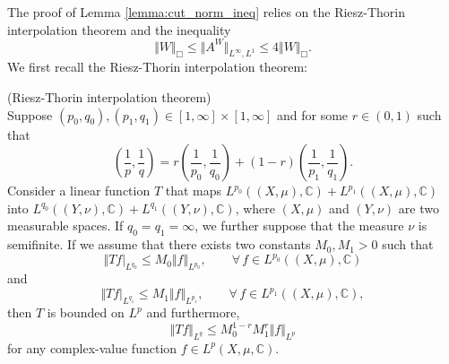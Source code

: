 The proof of Lemma \ref{lemma:cut_norm_ineq} relies on the Riesz-Thorin interpolation theorem and the inequality $$	\Vert W \Vert_{\Box} \leq \Vert A^W \Vert_{L^{\infty}, L^1} \leq 4 \Vert W \Vert_{\Box}.$$
We first recall the Riesz-Thorin interpolation theorem: 
\begin{theorem}(Riesz-Thorin interpolation theorem)\\
	Suppose $(p_0, q_0), (p_1, q_1)  \in [1,\infty] \times [1, \infty]$ and for some $r \in (0,1)$ such that
	$$ \left( \frac{1}{p}, \frac{1}{q} \right) = r  \left(\frac{1}{p_0}, \frac{1}{q_0} \right) + (1-r) \left( \frac{1}{p_1}, \frac{1}{q_1} \right).$$
	Consider a linear function $T$ that maps $L^{p_0}( (X, \mu), \mathbb{C})+ L^{p_1}( (X, \mu), \mathbb{C})$ into $L^{q_0}((Y, \nu), \mathbb{C}) + L^{q_1}( (Y, \nu), \mathbb{C})$, where $(X,\mu)$ and $(Y,\nu)$ are two measurable spaces. If $q_0 = q_1 = \infty$, we further suppose that the measure $\nu$ is semifinite.
	If we assume that there exists two constants $M_0, M_1 >0$ such that
	$$
	\Vert T f \vert_{L^{q_0}} \leq M_0 \Vert f \Vert_{L^{p_0}}, \qquad \forall \, f\in L^{p_0}( (X,\mu), \mathbb{C})
	$$
	and 
	$$
	\Vert T f \vert_{L^{q_1}} \leq M_1 \Vert f \Vert_{L^{p_1}}, \qquad \forall \, f\in L^{p_1}( (X,\mu), \mathbb{C}),
	$$
	then $T$ is bounded on $L^p$ and furthermore, 
	$$
	\Vert T f \Vert_{L^q} \leq M_0^{1-r} M_1^{r} \Vert f \Vert_{L^{p}}
	$$
	for any complex-value function $f \in L^{p}(X,\mu, \mathbb{C})$.
\end{theorem}

